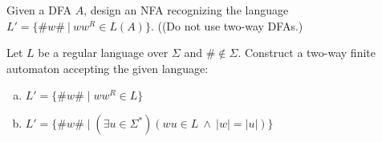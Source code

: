 \documentclass[a4paper,12pt]{amsart}
\begin{document}
\medskip\begin{problem}

    Given a DFA $A$, design an NFA recognizing the language $L'=\{\#w\#\ |\ ww^R\in L(A)\}$. ((Do not use two-way DFAs.)

\end{problem}


\medskip\begin{problem}

    Let $L$ be a regular language over $\Sigma$ and $\#\notin\Sigma$. Construct a two-way finite automaton accepting the given language: 

    \begin{enumerate}[(a)]
        \item $L' = \{\#w\#\mid ww^R \in L\}$
        \item $L' = \{\#w\#\mid (\exists u \in\Sigma^*)( wu \in L\ \wedge \ |w|=|u|)\}$
    \end{enumerate}

\end{problem}
\end{document}
